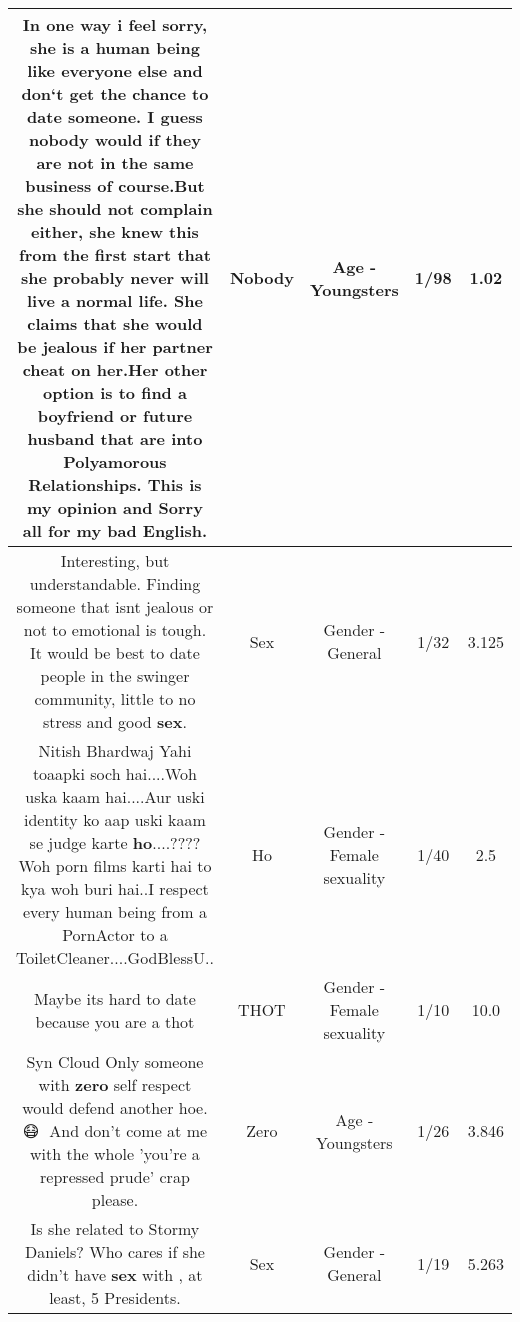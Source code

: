 \documentclass[11pt]{article}
\newlength\mylength
\begin{document}
\begin{center}
\begin{longtable}{|C{.65\mylength}|C{.30\mylength}|C{.12\mylength}|C{.12\mylength}|C{.12\mylength}|}
  \small In one way i feel sorry, she is a human being like everyone else and don`t get the chance to date someone. I guess \textbf{nobody} would if they are not in the same business of course.But she should not complain either, she knew this from the first start that she probably never will live a normal life. She claims that she would be jealous if her partner cheat on her.Her other option is to find a boyfriend or future husband that are into Polyamorous Relationships. This is my opinion and Sorry all for my bad English.\normalsize   & Nobody & Age - Youngsters & 1/98 & 1.02 \\  \hline
  \small Interesting, but understandable. Finding someone that isnt jealous or not to emotional is tough. It would be best to date people in the swinger community, little to no stress and good \textbf{sex}.\normalsize   & Sex & Gender - General & 1/32 & 3.125 \\  \hline
  \small Nitish Bhardwaj Yahi toaapki soch hai....Woh uska kaam hai....Aur uski identity ko aap uski kaam se judge karte \textbf{ho}....????Woh porn films karti hai to kya woh buri hai..I respect every human being from a PornActor to a ToiletCleaner....GodBlessU..\normalsize   & Ho & Gender - Female sexuality & 1/40 & 2.5 \\  \hline
  \small Maybe its hard to date because you are a thot\normalsize   & THOT & Gender - Female sexuality & 1/10 & 10.0 \\  \hline
  \small Syn Cloud Only someone with \textbf{zero} self respect would defend another hoe.😷🤢 And don't come at me with the whole 'you're a repressed prude' crap please.\normalsize   & Zero & Age - Youngsters & 1/26 & 3.846 \\  \hline
  \small Is she related to Stormy Daniels? Who cares if she didn't have \textbf{sex} with , at least, 5 Presidents.\normalsize   & Sex & Gender - General & 1/19 & 5.263 \\  \hline

\end{longtable}
\end{center}
\end{document}
